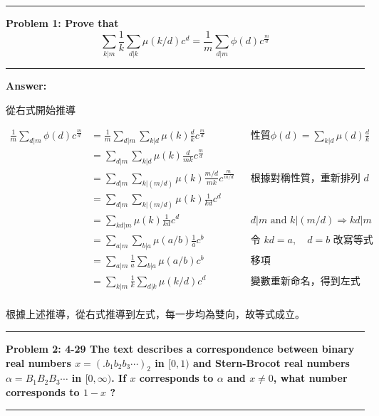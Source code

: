 \documentclass[11pt]{article}
\newcommand\question[2]{\vspace{.25in}\hrule\textbf{#1: #2}\vspace{.5em}\hrule\vspace{.10in}}
\renewcommand\part[1]{\vspace{.10in}\textbf{#1}}
\begin{document}
\raggedright
\newcommand\NAME{Shiang-Yun Yang 楊翔雲}  %
\newcommand\ANDREWID{R04922067}     %
\newcommand\HWNUM{4}              %



\question{Problem 1} {Prove that 
	$$\sum_{k|m} \frac{1}{k} \sum_{d|k} \mu(k/d)c^d 
		= \frac{1}{m} \sum_{d|m} \phi(d) c^{\frac{m}{d}}$$
}

\part{Answer:}

從右式開始推導

\begin{align*}
	\frac{1}{m} \sum_{d|m} \phi(d) c^{\frac{m}{d}} &= 
		\frac{1}{m} \sum_{d|m} \sum_{k|d} \mu(k) \frac{d}{k} c^{\frac{m}{d}}
			&& \text{性質} \phi(d) = \sum_{k|d} \mu(d) \frac{d}{k} \\
		&= \sum_{d|m} \sum_{k|d} \mu(k) \frac{d}{mk} c^{\frac{m}{d}} \\
		&= \sum_{d|m} \sum_{k|(m/d)} \mu(k) \frac{m/d}{mk} c^{\frac{m}{m/d}} 
			&& \text{根據對稱性質，重新排列 } d \\
		&= \sum_{d|m} \sum_{k|(m/d)} \mu(k) \frac{1}{kd} c^d \\
		&= \sum_{kd|m} \mu(k) \frac{1}{kd} c^d 
			&& d|m \text{ and } k|(m/d) \Rightarrow kd|m \\
		&= \sum_{a|m} \sum_{b|a} \mu(a/b) \frac{1}{a} c^b 
			&& \text{令 } kd=a, \quad d = b \text{ 改寫等式} \\
		&= \sum_{a|m} \frac{1}{a} \sum_{b|a} \mu(a/b) c^b 
			&& \text{移項} \\
		&= \sum_{k|m} \frac{1}{k} \sum_{d|k} \mu(k/d) c^d 
			&& \text{變數重新命名，得到左式} \\
\end{align*}

根據上述推導，從右式推導到左式，每一步均為雙向，故等式成立。

\question{Problem 2} {4-29 The text describes a correspondence between
	binary real numbers $x = (.b_1 b_2 b_3 \cdots)_2$ in $[0, 1)$ and 
	Stern-Brocot real numbers $\alpha = B_1 B_2 B_3 \cdots$ in 
	$[0, \infty)$. If $x$ corresponds to $\alpha$ and $x \neq 0$, 
	what number corresponds to $1-x$ ?
}
\end{document}
